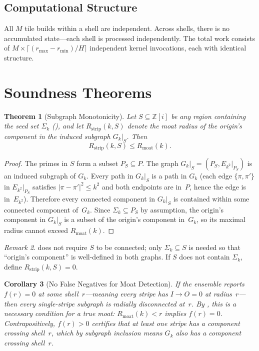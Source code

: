 \documentclass[11pt,a4paper]{article}
\newtheorem{theorem}{Theorem}[section]
\newtheorem{corollary}[theorem]{Corollary}
\theoremstyle{definition}
\theoremstyle{remark}
\newtheorem{remark}[theorem]{Remark}
\newcommand{\Zi}{\mathbb{Z}[i]}
\newcommand{\IO}{I{\to}O}
\begin{document}
\subsection{Computational Structure}

All $M$ tile builds within a shell are independent.  Across shells,
there is no accumulated state---each shell is processed independently.
The total work consists of $M \times \lceil(r_{\max} - r_{\min})/H\rceil$
independent kernel invocations, each with identical structure.

\section{Soundness Theorems}\label{sec:sound}

\begin{theorem}[Subgraph Monotonicity]\label{thm:mono}
Let $S \subseteq \Zi$ be any region containing the seed set
$\Sigma_k$ (), and let
$R_{\mathrm{strip}}(k, S)$ denote the moat radius of the origin's
component in the induced subgraph $G_k|_S$.  Then
\[
  R_{\mathrm{strip}}(k, S) \le R_{\mathrm{moat}}(k).
\]
\end{theorem}

\begin{proof}
The primes in $S$ form a subset $P_S \subseteq P$.  The graph
$G_k|_S = (P_S, E_{k^2}|_{P_S})$ is an induced subgraph of $G_k$.  Every
path in $G_k|_S$ is a path in $G_k$ (each edge $\{\pi,\pi'\}$ in
$E_{k^2}|_{P_S}$ satisfies $|\pi-\pi'|^2 \le k^2$ and both endpoints are
in~$P$, hence the edge is in~$E_{k^2}$).  Therefore every connected
component in $G_k|_S$ is contained within some connected component
of~$G_k$.  Since $\Sigma_k \subseteq P_S$ by assumption, the origin's
component in $G_k|_S$ is a subset of the origin's component in~$G_k$,
so its maximal radius cannot exceed $R_{\mathrm{moat}}(k)$.
\end{proof}

\begin{remark}
 does not require $S$ to be connected; only
$\Sigma_k \subseteq S$ is needed so that ``origin's component'' is
well-defined in both graphs.  If $S$ does not contain $\Sigma_k$,
define $R_{\mathrm{strip}}(k,S) = 0$.
\end{remark}

\begin{corollary}[No False Negatives for Moat Detection]\label{cor:zfn}
If the ensemble reports $f(r) = 0$ at some shell~$r$---meaning every
stripe has $\IO = 0$ at radius~$r$---then \emph{every} single-stripe
subgraph is radially disconnected at~$r$.  By , this
is a \emph{necessary} condition for a true moat:
$R_{\mathrm{moat}}(k) < r$ implies $f(r) = 0$.
Contrapositively, $f(r) > 0$ certifies that at least one stripe has
a component crossing shell~$r$, which by subgraph inclusion means
$G_k$ also has a component crossing shell~$r$.
\end{corollary}
\end{document}
